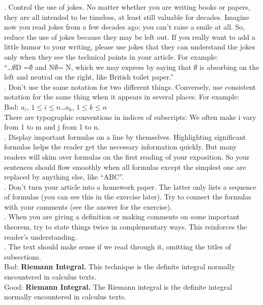 \documentclass[12pt,a4paper]{article}  %
\theoremstyle{definition}
\numberwithin{equation}{section}
\begin{document}
. Control the use of jokes. No matter whether you are writing books or papers, they are all intended to be timeless, at least still valuable for decades. Imagine now you read jokes from a few decades ago; you can't raise a smile at all. So, reduce the use of jokes because they may be left out. If you really want to add a little humor to your writing, please use jokes that they can understand the jokes only when they see the technical points in your article. For example:\\
\indent ``\dots $\emptyset$D =$\emptyset$  and N$\emptyset$= N, which we may express by saying that $\emptyset$ is absorbing on the left and neutral on the right, like British toilet paper.''\\

. Don't use the same notation for two different things. Conversely, use consistent notation for the same thing when it appears in several places. For example:\\
\indent Bad: $a_i$, $1\leq i\leq n$\dots$a_k$, $1\leq k\leq n$\\
There are typographic conventions in indices of subscripts: We often make i vary from 1 to m and j from 1 to n. \\

. Display important formulas on a line by themselves. Highlighting significant formulas helps the reader get the necessary information quickly. But many readers will skim over formulas on the first reading of your exposition. So your sentences should flow smoothly when all formulas except the simplest one are replaced by anything else, like ``ABC''.\\

. Don't turn your article into a homework paper. The latter only lists a sequence of formulas (you can see this in the exercise later). Try to connect the formulas with your comments (see the answer for the exercise).\\

. When you are giving a definition or making comments on some important theorem, try to state things twice in complementary ways. This reinforces the reader's understanding.\\

. The text should make sense if we read through it, omitting the titles of subsections.\\
\indent Bad: \textbf{Riemann Integral.} This technique is the definite integral normally encountered in calculus texts.\\
\indent Good: \textbf{Riemann Integral.} The Riemann integral is the definite integral normally encountered in calculus texts.\\
\end{document}
